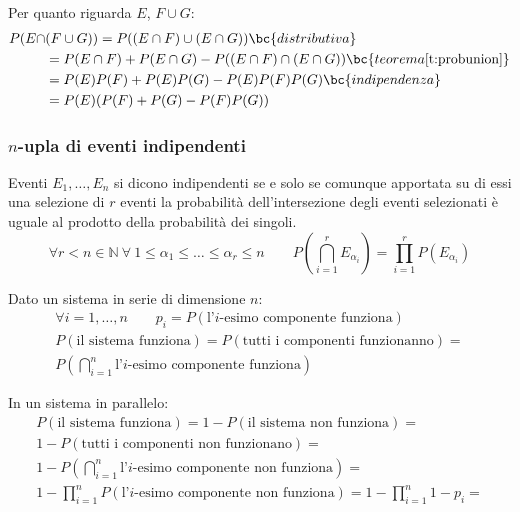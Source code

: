 \noindent
Per quanto riguarda $E$, $F\cup G$:
\begin{align*}
	P(E \cap & (F\cup G))  = P((E\cap F)\cup (E\cap G))                \bc{distributiva}              \\
	         & = P(E \cap F) + P(E\cap G) - P((E\cap F)\cap (E\cap G)) \bc{teorema \ref{t:probunion}} \\
	         & = P(E)P(F) + P(E)P(G) - P(E)P(F)P(G)                    \bc{indipendenza}              \\
	         & = P(E)(P(F) + P(G)-P(F)P(G))
\end{align*}

\subsubsection{\texorpdfstring{$n$}{n}-upla di eventi indipendenti}
\begin{defin}
	Eventi $E_1,\dots,E_n$ si dicono indipendenti se e solo se comunque apportata su di essi una selezione di $r$ eventi la probabilità dell'intersezione degli eventi selezionati è uguale al prodotto della probabilità dei singoli.
	\begin{equation*}
		\forall r<n\in\mathbb{N}~\forall~1\leq \alpha_1 \leq\dots\leq\alpha_r\leq n \qquad P \left(\bigcap_{i=1}^r E_{\alpha_i} \right)=\prod_{i=1}^r P(E_{\alpha_i})
	\end{equation*}
\end{defin}

\begin{examp}
	Dato un sistema in serie di dimensione $n$:
	\begin{gather*}
		\forall i=1,\dots,n \qquad p_i=P(\text{l'}i\text{-esimo componente funziona}) \\[1ex]
		P(\text{il sistema funziona}) = P(\text{tutti i componenti funzionanno}) = \\
		P\left(\bigcap_{i=1}^n \text{l'}i\text{-esimo componente funziona}\right)
	\end{gather*}

	In un sistema in parallelo:
	\begin{gather*}
		P(\text{il sistema funziona}) = 1-P(\text{il sistema non funziona}) = \\[1ex]
		1-P(\text{tutti i componenti non funzionano}) = \\[1ex]
		1- P\left(\bigcap_{i=1}^n \text{l'}i\text{-esimo componente non funziona}\right) = \\[1ex]
		1-\prod_{i=1}^n P(\text{l'}i\text{-esimo componente non funziona}) =
		1-\prod_{i=1}^n 1-p_i =
	\end{gather*}
\end{examp}
